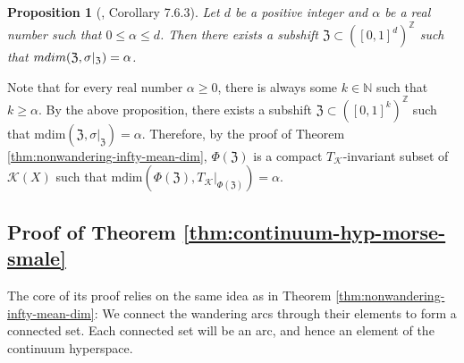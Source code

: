 \documentclass[sn-mathphys-num]{sn-jnl}%
\theoremstyle{thmstyleone}%
\newtheorem{proposition}{Proposition}%
\theoremstyle{thmstyletwo}%
\theoremstyle{thmstylethree}%
\newcommand*\induce[1]{#1_\mathcal{K}}
\newcommand*\hyp[1]{\mathcal{#1}}
\begin{document}
\begin{proposition}[\cite{coornaert_2015}, Corollary 7.6.3]
    Let $d$ be a positive integer and $\alpha$ be a real number such that $0 \leq \alpha \leq d$. Then there exists a subshift $\mathfrak{Z} \subset ([0, 1]^d)^\mathbb{Z}$ such that $\emph{mdim}(\mathfrak{Z}, \sigma|_\mathfrak{Z}) = \alpha$.\\
\end{proposition}

Note that for every real number $\alpha \geq 0$, there is always some $k \in \mathbb{N}$ such that $k \geq \alpha$. By the above proposition, there exists a subshift $\mathfrak{Z} \subset ([0, 1]^k)^\mathbb{Z}$ such that $\text{mdim}(\mathfrak{Z}, \sigma|_\mathfrak{Z}) = \alpha$. Therefore, by the proof of Theorem \ref{thm:nonwandering-infty-mean-dim}, $\Phi(\mathfrak{Z})$ is a compact $\induce{T}$-invariant subset of $\hyp{K}(X)$ such that $\text{mdim}(\Phi(\mathfrak{Z}), \induce{T}|_{\Phi(\mathfrak{Z})}) = \alpha$.


\subsection{Proof of Theorem \ref{thm:continuum-hyp-morse-smale}}\label{subsec:proof-thm-morse-smale-continuum-hyp}

    The core of its proof relies on the same idea as in Theorem \ref{thm:nonwandering-infty-mean-dim}: We connect the wandering arcs through their elements to form a connected set. Each connected set will be an arc, and hence an element of the continuum hyperspace.
    
\end{document}
